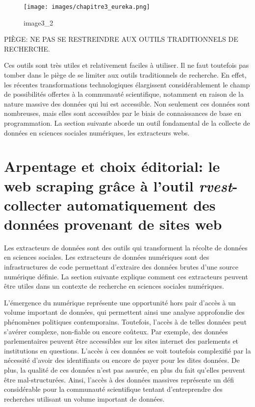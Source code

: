 \documentclass[
  letterpaper,
  DIV=11,
  numbers=noendperiod]{scrreprt}
\begin{document}
\begin{figure}

{\centering \texttt{[image: images/chapitre3\_eureka.png]}

}

\caption{image3\_2}

\end{figure}

PIÈGE: NE PAS SE RESTREINDRE AUX OUTILS TRADITIONNELS DE RECHERCHE.

Ces outils sont très utiles et relativement faciles à utiliser. Il ne
faut toutefois pas tomber dans le piège de se limiter aux outils
traditionnels de recherche. En effet, les récentes transformations
technologiques élargissent considérablement le champ de possibilités
offertes à la communauté scientifique, notamment en raison de la nature
massive des données qui lui est accessible. Non seulement ces données
sont nombreuses, mais elles sont accessibles par le biais de
connaissances de base en programmation. La section suivante aborde un
outil fondamental de la collecte de données en sciences sociales
numériques, les extracteurs webs.

\hypertarget{arpentage-et-choix-uxe9ditorial-le-web-scraping-gruxe2ce-uxe0-loutil-rvest--collecter-automatiquement-des-donnuxe9es-provenant-de-sites-web}{%
\section{\texorpdfstring{\textbf{Arpentage et choix éditorial: le web
scraping grâce à l'outil \emph{rvest}- collecter automatiquement des
données provenant de sites
web}}{Arpentage et choix éditorial: le web scraping grâce à l'outil rvest- collecter automatiquement des données provenant de sites web}}\label{arpentage-et-choix-uxe9ditorial-le-web-scraping-gruxe2ce-uxe0-loutil-rvest--collecter-automatiquement-des-donnuxe9es-provenant-de-sites-web}}

Les extracteurs de données sont des outils qui transforment la récolte
de données en sciences sociales. Les extracteurs de données numériques
sont des infrastructures de code permettant d'extraire des données
brutes d'une source numérique définie. La section suivante explique
comment ces extracteurs peuvent être utiles dans un contexte de
recherche en sciences sociales numériques.

L'émergence du numérique représente une opportunité hors pair d'accès à
un volume important de données, qui permettent ainsi une analyse
approfondie des phénomènes politiques contemporains. Toutefois, l'accès
à de telles données peut s'avérer complexe, non-fiable ou encore
coûteux. Par exemple, des données parlementaires peuvent être
accessibles sur les sites internet des parlements et institutions en
questions. L'accès à ces données se voit toutefois complexifié par la
nécessité d'avoir des identifiants ou encore de payer pour les dites
données. De plus, la qualité de ces données n'est pas assurée, en plus
du fait qu'elles peuvent être mal-structurées. Ainsi, l'accès à des
données massives représente un défi considérable pour la communauté
scientifique tentant d'entreprendre des recherches utilisant un volume
important de données.
\end{document}
